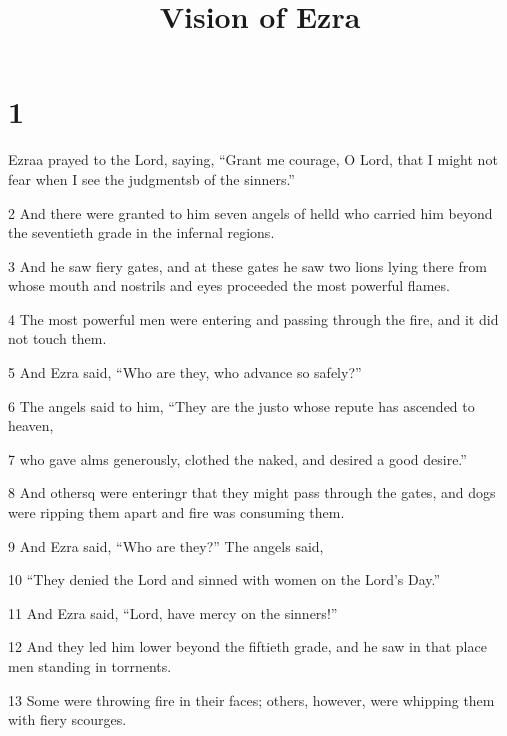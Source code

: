 

\title{Vision of Ezra}

\chapter{1}

\par Ezraa prayed to the Lord, saying, “Grant me courage, O Lord, that I might not fear when I see the judgmentsb of the sinners.”

\par 2 And there were granted to him seven angels of helld who carried him beyond the seventieth grade in the infernal regions.

\par 3 And he saw fiery gates, and at these gates he saw two lions lying there from whose mouth and nostrils and eyes proceeded the most powerful flames.

\par 4 The most powerful men were entering and passing through the fire, and it did not touch them. 

\par 5 And Ezra said, “Who are they, who advance so safely?” 

\par 6 The angels said to him, “They are the justo whose repute has ascended to heaven,

\par 7 who gave alms generously, clothed the naked, and desired a good desire.” 

\par 8 And othersq were enteringr that they might pass through the gates, and dogs were ripping them apart and fire was consuming them.

\par 9 And Ezra said, “Who are they?” The angels said,

\par 10 “They denied the Lord and sinned with women on the Lord's Day.”

\par 11 And Ezra said, “Lord, have mercy on the sinners!”

\par 12 And they led him lower beyond the fiftieth grade, and he saw in that place men standing in torrnents.

\par 13 Some were throwing fire in their faces; others, however, were whipping them with fiery scourges.

